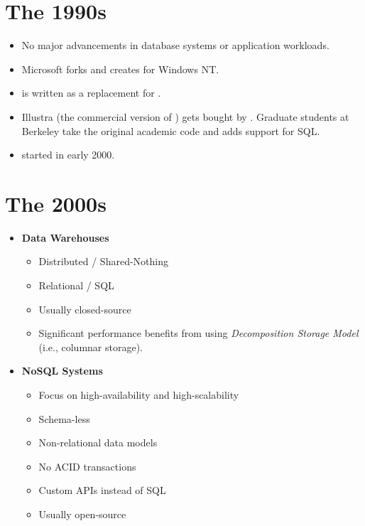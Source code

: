 \documentclass[11pt]{article}
\begin{document}
\section{The 1990s}
\begin{itemize}
    \item No major advancements in database systems or application workloads.
    \item
    Microsoft forks  and creates  for Windows NT.
    
    \item
     is written as a replacement for .
    
    \item
    Illustra (the commercial version of ) gets bought by . 
    Graduate students at Berkeley take the original academic  code and adds 
    support for SQL.
    
    \item
     started in early 2000.
\end{itemize}

\section{The 2000s}
\begin{itemize}
    \item \textbf{Data Warehouses}
    \begin{itemize}
        \item Distributed / Shared-Nothing
        \item Relational / SQL
        \item Usually closed-source
        \item
        Significant performance benefits from using \textit{Decomposition Storage Model}
        (i.e., columnar storage).
    \end{itemize}
    
    \item \textbf{NoSQL Systems}~\cite{cattell10}
    \begin{itemize}
        \item Focus on high-availability and high-scalability
        \item Schema-less
        \item Non-relational data models
        \item No ACID transactions
        \item Custom APIs instead of SQL
        \item Usually open-source
    \end{itemize}
\end{itemize}
\end{document}
